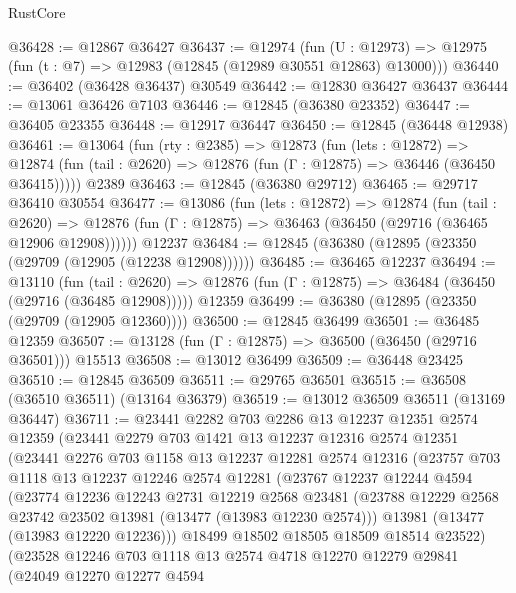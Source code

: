 \begin{lexlean}{RustCore}
\begin{coremodule}
@36428 := @12867 @36427
@36437 := @12974
    (fun (U : @12973) => @12975 (fun (t : @7) => @12983 (@12845 (@12989 @30551 @12863) @13000)))
@36440 := @36402 (@36428 @36437) @30549
@36442 := @12830 @36427 @36437
@36444 := @13061 @36426 @7103
@36446 := @12845 (@36380 @23352)
@36447 := @36405 @23355
@36448 := @12917 @36447
@36450 := @12845 (@36448 @12938)
@36461 := @13064
    (fun (rty : @2385) =>
    @12873
      (fun (lets : @12872) =>
      @12874 (fun (tail : @2620) => @12876 (fun (Γ : @12875) => @36446 (@36450 @36415)))))
    @2389
@36463 := @12845 (@36380 @29712)
@36465 := @29717 @36410 @30554
@36477 := @13086
    (fun (lets : @12872) =>
    @12874
      (fun (tail : @2620) =>
      @12876 (fun (Γ : @12875) => @36463 (@36450 (@29716 (@36465 @12906 @12908))))))
    @12237
@36484 := @12845 (@36380 (@12895 (@23350 (@29709 (@12905 (@12238 @12908))))))
@36485 := @36465 @12237
@36494 := @13110
    (fun (tail : @2620) => @12876 (fun (Γ : @12875) => @36484 (@36450 (@29716 (@36485 @12908)))))
    @12359
@36499 := @36380 (@12895 (@23350 (@29709 (@12905 @12360))))
@36500 := @12845 @36499
@36501 := @36485 @12359
@36507 := @13128 (fun (Γ : @12875) => @36500 (@36450 (@29716 @36501))) @15513
@36508 := @13012 @36499
@36509 := @36448 @23425
@36510 := @12845 @36509
@36511 := @29765 @36501
@36515 := @36508 (@36510 @36511) (@13164 @36379)
@36519 := @13012 @36509 @36511 (@13169 @36447)
@36711 := @23441
    @2282
    @703
    @2286
    @13
    @12237
    @12351
    @2574
    @12359
    (@23441
      @2279
      @703
      @1421
      @13
      @12237
      @12316
      @2574
      @12351
      (@23441
        @2276
        @703
        @1158
        @13
        @12237
        @12281
        @2574
        @12316
        (@23757
          @703
          @1118
          @13
          @12237
          @12246
          @2574
          @12281
          (@23767
            @12237
            @12244
            @4594
            (@23774
              @12236
              @12243
              @2731
              @12219
              @2568
              @23481
              (@23788 @12229 @2568 @23742 @23502 @13981 (@13477 (@13983 @12230 @2574)))
              @13981
              (@13477 (@13983 @12220 @12236)))
            @18499
            @18502
            @18505
            @18509
            @18514
            @23522)
          (@23528
            @12246
            @703
            @1118
            @13
            @2574
            @4718
            @12270
            @12279
            @29841
            (@24049
              @12270
              @12277
              @4594

\end{coremodule}
\end{lexlean}
